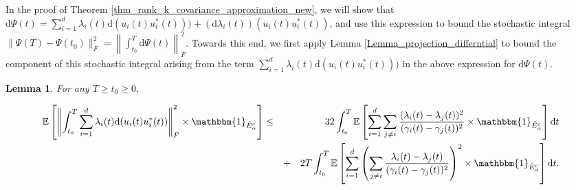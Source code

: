 \documentclass[11pt,letterpaper]{article}
\newtheorem{lemma}[theorem]{Lemma}
\begin{document}
\noindent
 In the proof of Theorem \ref{thm_rank_k_covariance_approximation_new}, we will show that
  $\mathrm{d} \Psi(t) = \sum_{i=1}^d \lambda_i(t) \mathrm{d}(u_i(t) u_i^\ast(t))) + (\mathrm{d}\lambda_i(t)) (u_i(t) u_i^\ast(t))$,
%
%
%
and use this expression to bound the stochastic integral $\| \Psi(T) - \Psi(t_0) \|_F^2 = \left \| \int_{t_0}^T \mathrm{d} \Psi(t) \right \|_F^2$.
%
Towards this end, we first apply Lemma \ref{Lemma_projection_differntial} to bound the component of this stochastic integral arising from the term $\sum_{i=1}^d \lambda_i(t) \mathrm{d}(u_i(t) u_i^\ast(t)))$ in the above expression for $\mathrm{d} \Psi(t)$.

\begin{lemma} \label{Lemma_integral}
For any $T\geq t_0 \geq 0$, 



\begin{eqnarray*}
\mathbb{E}\left[\left\|\int_{t_0}^T \sum_{i=1}^d   \lambda_i(t) \mathrm{d}( u_i(t) u_i^\ast(t))\right\|_F^2 \times \mathbbm{1}_{\hat{E}_\alpha^c} \right] &\leq& 
%
 32\int_{t_0}^{T}   \mathbb{E}\left[ \sum_{i=1}^{d}  \sum_{j \neq i}  \frac{(\lambda_i(t) - \lambda_j(t))^2}{(\gamma_i(t) -  \gamma_j(t))^2} \times \mathbbm{1}_{\hat{E}_\alpha^c} \right]  \mathrm{d}t \nonumber\\ 
     & &  + \quad   2 T \int_{t_0}^{T}\mathbb{E}\left[\sum_{i=1}^{d}\left(\sum_{j\neq i} \frac{\lambda_i(t) - \lambda_j(t)}{(\gamma_i(t) -  \gamma_j(t))^2}\right)^2 \times \mathbbm{1}_{\hat{E}_\alpha^c}  \right]\mathrm{d}t.
%
\end{eqnarray*}


\end{lemma}
\end{document}
